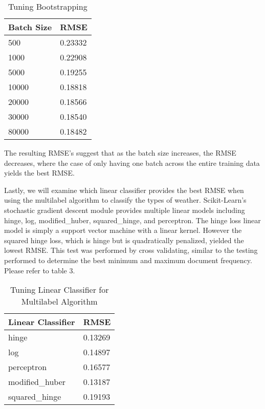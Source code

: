 \documentclass{article}
\begin{document}
\begin{table}[h]
\begin{center}
\begin{tabular}{ l | l }
Batch Size & RMSE    \\ \hline
500        & 0.23332 \\
1000       & 0.22908 \\
5000       & 0.19255 \\
10000      & 0.18818 \\
20000      & 0.18566 \\
30000      & 0.18540 \\
80000      & 0.18482
\end{tabular}
\caption{Tuning Bootstrapping}
\end{center}
\end{table}

The resulting RMSE's suggest that as the batch size increases, the RMSE decreases, where the case of only having one batch across the entire training data yields the best RMSE.

Lastly, we will examine which linear classifier provides the best RMSE when using the multilabel algorithm to classify the types of weather. Scikit-Learn's stochastic gradient descent module provides multiple linear models including hinge, log, modified\_huber, squared\_hinge, and perceptron. The hinge loss linear model is simply a support vector machine with a linear kernel. However the squared hinge loss, which is hinge but is quadratically penalized, yielded the lowest RMSE. This test was performed by cross validating, similar to the testing performed to determine the best minimum and maximum document frequency. Please refer to table 3.

\begin{table}[h]
\begin{center}
\begin{tabular}{ l | l }
Linear Classifier & RMSE    \\ \hline
hinge             & 0.13269 \\
log               & 0.14897 \\
perceptron        & 0.16577 \\
modified\_huber   & 0.13187 \\
squared\_hinge    & 0.19193
\end{tabular}
\caption{Tuning Linear Classifier for Multilabel Algorithm}
\end{center}
\end{table}
\end{document}
